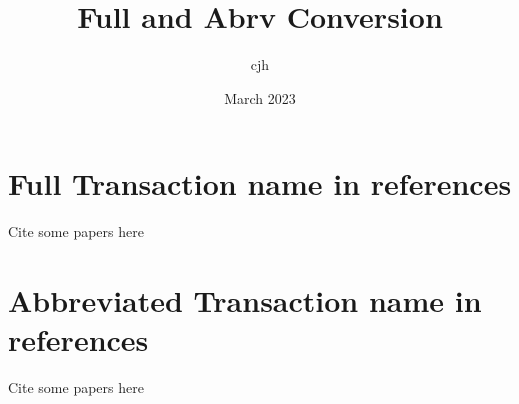\documentclass[journal]{IEEEtran}
\title{Full and Abrv Conversion}
\author{cjh}
\date{March 2023}
\begin{document}

\maketitle



\section{Full Transaction name in references}

Cite some papers here\cite{
1995-Bodson.Chiasson.ea-Nonlinear,
2010-Foo.Rahman-Sensorless,
1991-Lorenz.VanPatten-High,
2003-Kim.Harke.ea-Sensorless,
2012-Yang.Lorenz-Surface,
2010-Kim.Degner.ea-Discrete,
2015-Li.Qu.ea-Synthesis,
1955-Rauch.Johnson-Design,
1989-Slemon-Modelling,
2003-Chen.Tomita.ea-extended,
2018-Ou.Liu.ea-Experimental,
2022-Chen.Mei.ea-Online}



\newpage 
\section{Abbreviated Transaction name in references}

Cite some papers here\cite{
1995-Bodson.Chiasson.ea-Nonlinear,
2010-Foo.Rahman-Sensorless,
1991-Lorenz.VanPatten-High,
2003-Kim.Harke.ea-Sensorless,
2012-Yang.Lorenz-Surface,
2010-Kim.Degner.ea-Discrete,
2015-Li.Qu.ea-Synthesis,
1955-Rauch.Johnson-Design,
1989-Slemon-Modelling,
2003-Chen.Tomita.ea-extended,
2018-Ou.Liu.ea-Experimental,
2022-Chen.Mei.ea-Online}


\end{document}
